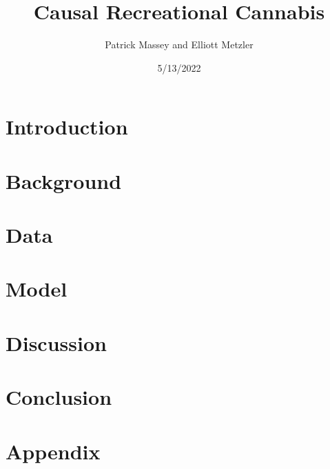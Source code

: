\documentclass{article}
\author{Patrick Massey and Elliott Metzler}
\title{Causal Recreational Cannabis}
\date{5/13/2022}
\begin{document}
\maketitle

\begin{abstract}

\end{abstract}

\newpage

\section{Introduction}

\section{Background}



\section{Data}















\section{Model}

\section{Discussion}

\section{Conclusion}

\section{Appendix}
\end{document}
